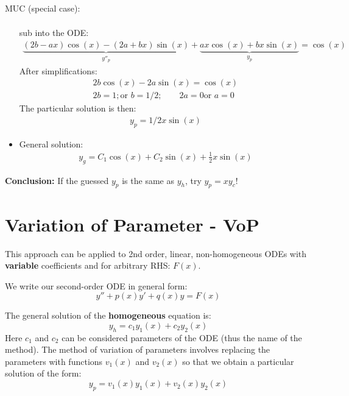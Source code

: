 \begin{exmp}{MUC (special case):}
\begin{itemize}
\begin{align*}
\end{align*}
sub into the ODE:
\begin{align*}
\underbrace{(2b-ax)\cos(x)-(2a+bx)\sin(x)}_{y''_p}+\underbrace{ax\cos(x)+bx\sin(x)}_{y_p}=\cos(x)
\end{align*}
After simplifications:
\begin{align*}
2b\cos(x)-2a\sin(x)=\cos(x)\\
2b=1; \text{or } b=1/2; \qquad 2a=0 \text{or } a=0
\end{align*}
The particular solution is then:
\begin{align*}
y_p=1/2x \sin(x)
\end{align*}
\item General solution:
\begin{align*}
\boxed{y_g=C_1 \cos(x)+C_2 \sin(x)+\frac{1}{2}x \sin(x)}
\end{align*}

\end{itemize}
\end{exmp}
\textbf{Conclusion:} If the guessed $y_p$ is the same as $y_h$, try $y_p=xy_c$!





\section{Variation of Parameter - VoP}
This approach can be applied to 2nd order, linear, non-homogeneous ODEs with \textbf{variable} coefficients and for arbitrary RHS: $F(x)$.

We write our second-order ODE in general form:
\begin {equation*}
y''+p(x) y' + q(x)y=F(x)
\end {equation*}

The general solution of the \textbf{homogeneous} equation is:
\begin {equation*}
y_h=c_1 y_1(x) +c_2 y_2(x)
\end {equation*}
Here $c_1$ and $c_2$ can be considered parameters of the ODE (thus the name of the method). The method of variation of parameters involves replacing the parameters with functions $v_1(x)$  and  $v_2(x)$ so that we obtain a particular solution of the form:
\begin {equation*}
y_p=v_1(x) y_1(x) +v_2(x) y_2(x)
\end {equation*}

